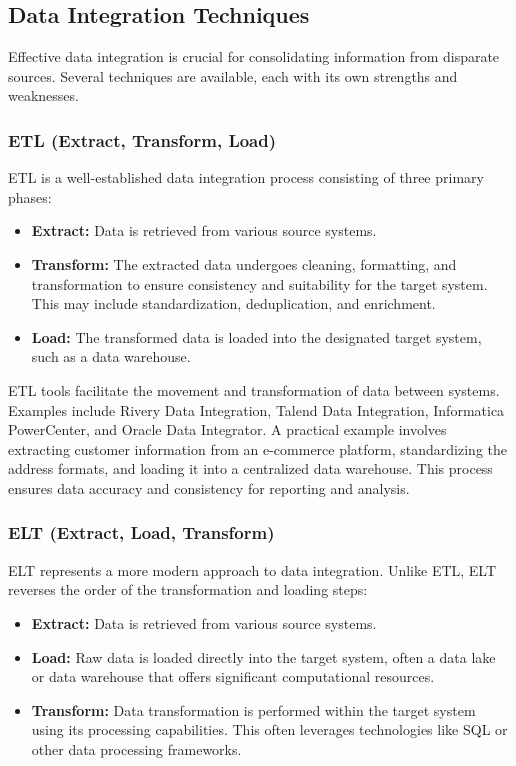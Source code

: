 \documentclass[12pt]{book}
\begin{document}
\subsection{Data Integration Techniques}

Effective data integration is crucial for consolidating information from disparate sources. Several techniques are available, each with its own strengths and weaknesses.

\subsubsection{ETL (Extract, Transform, Load)}

ETL is a well-established data integration process consisting of three primary phases:

\begin{itemize}
    \item \textbf{Extract:} Data is retrieved from various source systems.
    \item \textbf{Transform:} The extracted data undergoes cleaning, formatting, and transformation to ensure consistency and suitability for the target system.  This may include standardization, deduplication, and enrichment.
    \item \textbf{Load:} The transformed data is loaded into the designated target system, such as a data warehouse.
\end{itemize}

ETL tools facilitate the movement and transformation of data between systems. Examples include Rivery Data Integration, Talend Data Integration, Informatica PowerCenter, and Oracle Data Integrator. A practical example involves extracting customer information from an e-commerce platform, standardizing the address formats, and loading it into a centralized data warehouse. This process ensures data accuracy and consistency for reporting and analysis.

\subsubsection{ELT (Extract, Load, Transform)}

ELT represents a more modern approach to data integration. Unlike ETL, ELT reverses the order of the transformation and loading steps:

\begin{itemize}
    \item \textbf{Extract:} Data is retrieved from various source systems.
    \item \textbf{Load:} Raw data is loaded directly into the target system, often a data lake or data warehouse that offers significant computational resources.
    \item \textbf{Transform:} Data transformation is performed within the target system using its processing capabilities. This often leverages technologies like SQL or other data processing frameworks.
\end{itemize}
\end{document}
